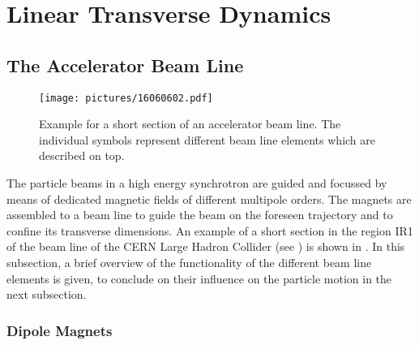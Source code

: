 \newpage
\section{Linear Transverse Dynamics}

\subsection{The Accelerator Beam Line}

\begin{figure}[htbp]  
    \centering
    \texttt{[image: pictures/16060602.pdf]}
    \caption{Example for a short section of an accelerator beam line. The individual symbols represent different beam line elements which are described on top.}  
    \label{pic:16060601}
\end{figure}

The particle beams in a high energy synchrotron are guided and focussed by means of dedicated magnetic fields of different multipole orders. The magnets are assembled to a beam line  to guide the beam on the foreseen trajectory and to confine its transverse dimensions. An example of a short section in the region IR1 of the beam line of the CERN Large Hadron Collider (see ) is shown in . In this subsection, a brief overview of the functionality of the different beam line elements is given, to conclude on their influence on the particle motion in the next subsection.

\subsubsection{Dipole Magnets} 


